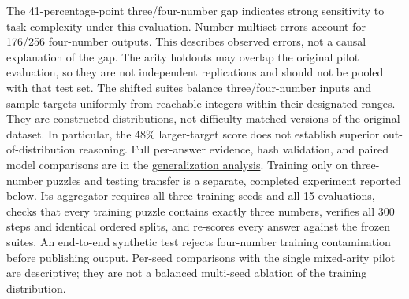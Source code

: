 \documentclass[11pt]{article}
\begin{document}
The 41-percentage-point three/four-number gap indicates strong sensitivity to
task complexity under this evaluation. Number-multiset errors account for
176/256 four-number outputs. This describes observed errors, not a causal
explanation of the gap. The arity holdouts may overlap the original pilot
evaluation, so they are not independent replications and should not be pooled
with that test set. The shifted suites balance three/four-number inputs and
sample targets uniformly from reachable integers within their designated ranges.
They are constructed distributions, not difficulty-matched versions of the
original dataset. In particular, the 48\% larger-target score does not establish
superior out-of-distribution reasoning. Full per-answer evidence, hash validation,
and paired model comparisons are in the
\href{https://wandb.ai/mohamedsobhi777/countdown-grpo/runs/p33k249f}{generalization analysis}.
Training only on three-number puzzles and testing transfer is a separate,
completed experiment reported below.
Its aggregator requires all three training seeds and all 15 evaluations,
checks that every training puzzle contains exactly three numbers, verifies all
300 steps and identical ordered splits, and re-scores every answer against the
frozen suites. An end-to-end synthetic test rejects four-number training
contamination before publishing output. Per-seed comparisons with the single
mixed-arity pilot are descriptive; they are not a balanced multi-seed ablation
of the training distribution.
\end{document}
